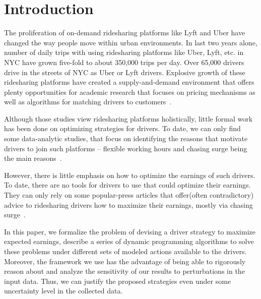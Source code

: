 
\section{Introduction}
\label{sec:introduction}

The proliferation of on-demand ridesharing platforms like Lyft and Uber
have changed the way people move within urban environments. 
In last two years alone, number of daily trips with using ridesharing platforms like Uber, Lyft, etc. in NYC have grown five-fold to about 350,000 trips per day. Over 65,000 drivers drive in the streets of NYC as Uber or Lyft drivers.
Explosive growth of these ridesharing platforms have created a supply-and-demand environment that offers 
plenty opportunities for academic research that focuses on pricing mechanisms
as well as algorithms for matching drivers to 
customers~\cite{banerjee2015pricing,ozkan2016dynamic}.

Although those studies view ridesharing platforms holistically, little formal work
has been done on optimizing strategies for drivers. To date, we can only find some data-analytic studies, that focus on identifying the reasons that motivate drivers to join such platforms -- flexible working hours and chasing surge being the main reasons~\cite{chen2015peeking,chen2016dynamic,hall2016analysis}.

However, there is little emphasis on how to optimize the earnings of such drivers.
To date, there are no tools for drivers to use that could optimize their earnings.
They can only rely on some 
popular-press articles that offer(often contradictory) advice to ridesharing drivers how to maximize their earnings, mostly via chasing surge~\cite{dont,tips}. 

 In this paper, we formalize the problem of devising a driver strategy to maximize expected 
 earnings, describe a series of dynamic programming algorithms to solve these problems
 under different sets of modeled actions available to the drivers. 
 Moreover, the framework we use has the advantage of being able to rigorously reason about  and analyze the sensitivity of our results to perturbations in the input data. 
 Thus, we can justify the proposed strategies even under some uncertainty level in the
 collected data.
  
